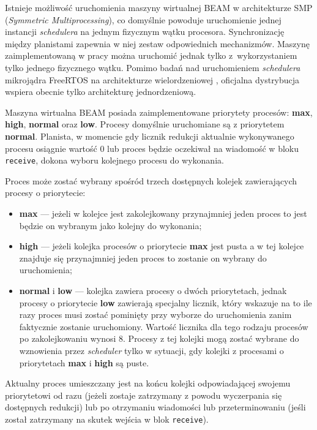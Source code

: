 Istnieje możliwość uruchomienia maszyny wirtualnej BEAM w architekturze SMP (\emph{Symmetric Multiprocessing}), co domyślnie powoduje uruchomienie jednej instancji \emph{schedulera} na jednym fizycznym wątku procesora.
Synchronizację między planistami zapewnia w niej zestaw odpowiednich mechanizmów.
Maszynę zaimplementowaną w pracy można uruchomić jednak tylko z~wykorzystaniem tylko jednego fizycznego wątku.
Pomimo badań nad uruchomieniem \emph{schedulera} mikrojądra FreeRTOS na architekturze wielordzeniowej \cite{Mistry2011}, oficjalna dystrybucja wspiera obecnie tylko architekturę jednordzeniową.

Maszyna wirtualna BEAM posiada zaimplementowane priorytety procesów: \textbf{max}, \textbf{high}, \textbf{normal} oraz \textbf{low}.
Procesy domyślnie uruchomiane są z priorytetem \textbf{normal}. 
Planista, w momencie gdy licznik redukcji aktualnie wykonywanego procesu osiągnie wartość 0 lub proces będzie oczekiwał na wiadomość w bloku \texttt{receive}, dokona wyboru kolejnego procesu do wykonania.

Proces może zostać wybrany spośród trzech dostępnych kolejek zawierających procesy o priorytecie:
\begin{itemize}
\item \textbf{max} --- jeżeli w kolejce jest zakolejkowany przynajmniej jeden proces to jest będzie on wybranym jako kolejny do wykonania;
\item \textbf{high} --- jeżeli kolejka procesów o priorytecie \textbf{max} jest pusta a w tej kolejce znajduje się przynajmniej jeden proces to zostanie on wybrany do uruchomienia;
\item \textbf{normal} i \textbf{low} --- kolejka zawiera procesy o dwóch priorytetach, jednak procesy o priorytecie \textbf{low} zawierają specjalny licznik, który wskazuje na to ile razy proces musi zostać pominięty przy wyborze do uruchomienia zanim faktycznie zostanie uruchomiony. Wartość licznika dla tego rodzaju procesów po zakolejkowaniu wynosi 8. Procesy z tej kolejki mogą zostać wybrane do wznowienia przez \emph{scheduler} tylko w sytuacji, gdy kolejki z procesami o priorytetach \textbf{max} i \textbf{high} są puste.
\end{itemize}

Aktualny proces umieszczany jest na końcu kolejki odpowiadającej swojemu priorytetowi od razu (jeżeli zostaje zatrzymany z powodu wyczerpania się dostępnych redukcji) lub po otrzymaniu wiadomości lub przeterminowaniu (jeśli został zatrzymany na skutek wejścia w blok \texttt{receive}).

